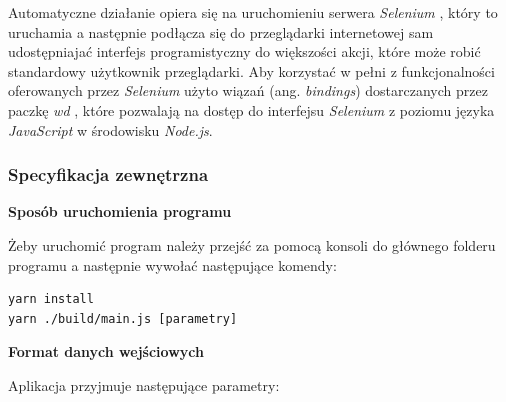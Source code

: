 \documentclass[polish, twoside, 12pt]{mwart}
\begin{document}
Automatyczne działanie opiera się na uruchomieniu serwera \emph{Selenium} \cite{selenium}, który to uruchamia a następnie podłącza się do przeglądarki internetowej sam udostępniajać interfejs programistyczny do większości akcji, które może robić standardowy użytkownik przeglądarki. Aby korzystać w pełni z funkcjonalności oferowanych przez \emph{Selenium} użyto wiązań (ang. \emph{bindings}) dostarczanych przez paczkę \emph{wd} \cite{wd}, które pozwalają na dostęp do interfejsu \emph{Selenium} z poziomu języka \emph{JavaScript} w środowisku \emph{Node.js}.

\subsubsection{Specyfikacja zewnętrzna}

\textbf{Sposób uruchomienia programu} \newline

Żeby uruchomić program należy przejść za pomocą konsoli do głównego folderu programu a następnie wywołać następujące komendy:

\begin{lstlisting}
yarn install
yarn ./build/main.js [parametry]
\end{lstlisting}

\textbf{Format danych wejściowych} \newline

Aplikacja przyjmuje następujące parametry:
\end{document}
